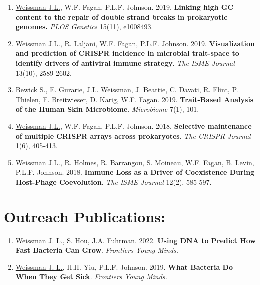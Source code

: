 \documentclass[]{res}
\begin{document}
\begin{resume}
\begin{enumerate}[leftmargin=*]
 \item \underline{Weissman J.L.}, W.F. Fagan, P.L.F. Johnson. 2019. {\bf Linking high GC content to the repair of double strand breaks in prokaryotic genomes.} \emph{PLOS Genetics} 15(11), e1008493.\\ %
 
 \item \underline{Weissman J.L.}, R. Laljani, W.F. Fagan, P.L.F. Johnson. 2019. {\bf Visualization and prediction of CRISPR incidence in microbial trait-space to identify drivers of antiviral immune strategy}. \emph{The ISME Journal} 13(10), 2589-2602. %
 
 \item Bewick S., E. Gurarie, \underline{J.L. Weissman}, J. Beattie, C. Davati, R. Flint, P. Thielen, F. Breitwieser, D. Karig, W.F. Fagan. 2019. {\bf Trait-Based Analysis of the Human Skin Microbiome}. \emph{Microbiome} 7(1), 101.  %

 \item \underline{Weissman J.L.}, W.F. Fagan, P.L.F. Johnson. 2018. {\bf Selective maintenance of multiple CRISPR arrays across prokaryotes}. \emph{The CRISPR Journal} 1(6), 405-413. %
 
\item \underline{Weissman J.L.}, R. Holmes, R. Barrangou, S. Moineau, W.F. Fagan, B. Levin, P.L.F. Johnson. 2018. {\bf Immune Loss as a Driver of Coexistence During Host-Phage Coevolution}. \emph{The ISME Journal} 12(2), 585-597. %

\end{enumerate} 

 
\section{Outreach Publications:} \vspace{0mm}

 \begin{enumerate}[leftmargin=*]

\item \underline{Weissman J. L.}, S. Hou, J.A. Fuhrman. 2022. {\bf Using DNA to Predict How Fast Bacteria Can Grow}. \emph{Frontiers Young Minds.}

\item \underline{Weissman J. L.}, H.H. Yiu, P.L.F. Johnson. 2019. {\bf What Bacteria Do When They Get Sick}. \emph{Frontiers Young Minds.}


\end{enumerate}
\end{resume}
\end{document}

